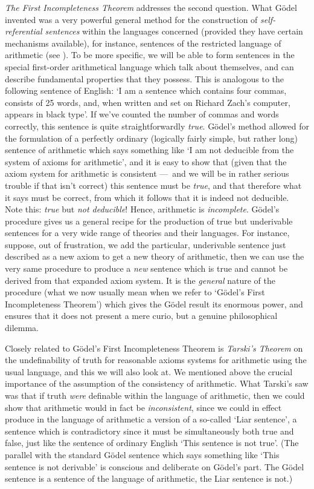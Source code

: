 \emph{The First Incompleteness Theorem} addresses the second question.
What G\"odel invented was a very powerful general method for the
construction of \emph{self-referential sentences} within  the
languages concerned (provided they have certain mechanisms available),
for instance, sentences of the restricted language of arithmetic (see
). To be more specific, we will be able to
form sentences in the special first-order arithmetical language which
talk about themselves, and can describe fundamental properties that
they possess. This is analogous to the following sentence of English:
`I am a sentence  which  contains four commas, consists of 25 words,
and, when written and set on Richard Zach's  computer,  appears in
black type'. If we've counted the number of commas and words
correctly, this sentence is quite straightforwardly \emph{true}.
G\"odel's method allowed for the formulation of a perfectly ordinary
(logically fairly simple, but rather long) sentence of arithmetic
which says something like `I am not deducible from the system of
axioms for arithmetic', and it is easy to show that (given that the
axiom system for arithmetic is consistent ---~and we will be in rather
serious  trouble if that isn't correct) this sentence must be
\emph{true}, and that therefore what it says must be correct, from
which it follows that it is indeed not deducible. Note this:
\emph{true} but \emph{not deducible}!{} Hence, arithmetic is
\emph{incomplete}. G\"odel's procedure gives us a general recipe for
the production of true but underivable sentences for a very wide range
of theories and their languages. For instance, suppose, out of
frustration,  we add the particular, underivable  sentence just
described as a new axiom to get a new theory of arithmetic, then we
can use the very same procedure to produce a \emph{new} sentence which
is true and cannot be derived from that  expanded axiom system. It is
the \emph{general} nature of the procedure (what we now usually mean
when we refer to `G\"odel's First Incompleteness Theorem') which gives
the G\"odel result its enormous power, and ensures that it does not
present a mere curio, but a genuine philosophical dilemma.

Closely related to G\"odel's First Incompleteness Theorem is
\emph{Tarski's Theorem} on the undefinability of truth for reasonable
axioms systems for arithmetic using the usual language, and this we
will also look at. We mentioned above the  crucial importance of the
assumption of the consistency of arithmetic. What Tarski's saw was
that if truth \emph{were} definable within  the language of
arithmetic, then we could show that arithmetic would in fact be
\emph{inconsistent}, since we could in effect produce in the language
of arithmetic a version of a so-called `Liar sentence', a sentence
which is contradictory since it must be simultaneously both true and
false, just like the sentence of ordinary English `This sentence is
not true'.  (The parallel with the standard G\"odel sentence which
says something like `This sentence is not derivable' is conscious and
deliberate on G\"odel's part. The G\"odel sentence is a sentence of
the language of arithmetic, the Liar sentence is not.)


